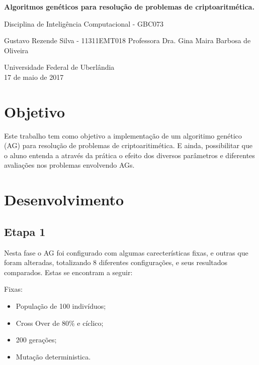 \documentclass[a4paper, 12pt]{article}
\begin{document}
  \begin{center}
      \vspace*{0.2cm}

      \LARGE
      \textbf{Algoritmos genéticos para resolução de problemas de criptoaritmética.}

      \vspace{0.5cm}

      Disciplina de Inteligência Computacional - GBC073

      \vspace{6cm}

      \Large
      Gustavo Rezende Silva - 11311EMT018
      Professora Dra. Gina Maira Barbosa de Oliveira\\

      \vspace{7cm}



      \Large
      Universidade Federal de Uberlândia\\

      17 de maio de 2017

  \end{center}

  \newpage

  \section{Objetivo}
  Este trabalho tem como objetivo a implementação de um algoritimo genético (AG) para
  resolução de problemas de criptoaritimética. E ainda, possibilitar que o aluno
  entenda a através da prática o efeito dos diversos parâmetros e diferentes
  avaliações nos problemas envolvendo AGs.


  \section{Desenvolvimento}

  \subsection{Etapa 1}
    Nesta fase o AG foi configurado com algumas carecterísticas fixas,
    e outras que foram alteradas, totalizando 8 diferentes configurações,
    e seus resultados comparados. Estas se encontram a seguir:

    Fixas:
    \begin{itemize}
    \item População de 100 indivíduos;
    \item Cross Over de 80\% e cíclico;
    \item 200 gerações;
    \item Mutação deterministica.
    \end{itemize}
\end{document}
